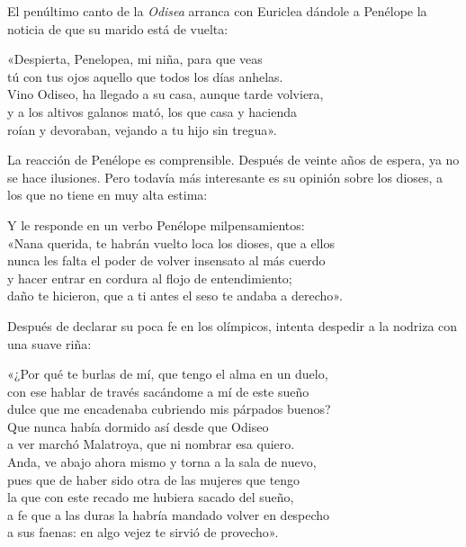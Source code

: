 \label{cap:penelope}

El penúltimo canto de la \emph{Odisea} arranca con Euriclea dándole a Penélope la noticia de que su marido está de vuelta:

\begin{versocita}
«Despierta, Penelopea, mi niña, para que veas\\
tú con tus ojos aquello que todos los días anhelas.\\
Vino Odiseo, ha llegado a su casa, aunque tarde volviera,\\
y a los altivos galanos mató, los que casa y hacienda\\
roían y devoraban, vejando a tu hijo sin tregua».
\end{versocita}

La reacción de Penélope es comprensible. Después de veinte años de espera, ya no se hace ilusiones. Pero todavía más interesante es su opinión sobre los dioses, a los que no tiene en muy alta estima:

\begin{versocita}
Y le responde en un verbo Penélope milpensamientos:\\
«Nana querida, te habrán vuelto loca los dioses, que a ellos\\
nunca les falta el poder de volver insensato al más cuerdo\\
y hacer entrar en cordura al flojo de entendimiento;\\
daño te hicieron, que a ti antes el seso te andaba a derecho».
\end{versocita}

Después de declarar su poca fe en los olímpicos, intenta despedir a la nodriza con una suave riña:

\begin{versocita}
«¿Por qué te burlas de mí, que tengo el alma en un duelo,\\
con ese hablar de través sacándome a mí de este sueño\\
dulce que me encadenaba cubriendo mis párpados buenos?\\
Que nunca había dormido así desde que Odiseo\\
a ver marchó Malatroya, que ni nombrar esa quiero.\\
Anda, ve abajo ahora mismo y torna a la sala de nuevo,\\
pues que de haber sido otra de las mujeres que tengo\\
la que con este recado me hubiera sacado del sueño,\\
a fe que a las duras la habría mandado volver en despecho\\
a sus faenas: en algo vejez te sirvió de provecho».
\end{versocita}


